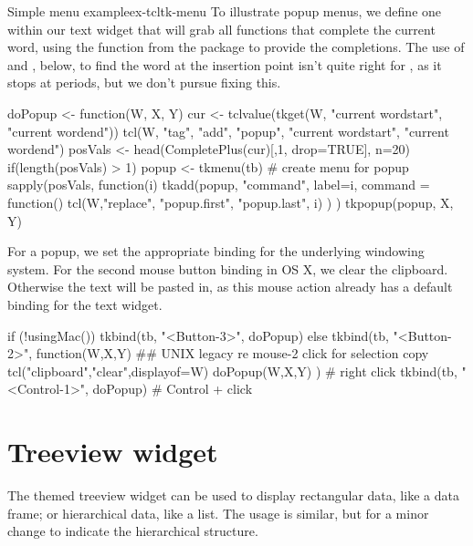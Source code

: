 \begin{example}{Simple menu example}{ex-tcltk-menu}
To illustrate popup menus, we define one within our text widget that
will grab all functions that complete the current word, using the
 function from the  package to
provide the completions.  The use of  and
, below, to find the word at the insertion point
isn't quite right for \R, as it stops at periods, but we don't pursue
fixing this.
\begin{Schunk}
\begin{Sinput}
 doPopup <- function(W, X, Y) {
   cur <- tclvalue(tkget(W, "current  wordstart", 
                            "current wordend"))
   tcl(W, "tag", "add", "popup", "current  wordstart", 
                                 "current wordend")
   posVals <- head(CompletePlus(cur)[,1, drop=TRUE], n=20)
   if(length(posVals) > 1) {
     popup <- tkmenu(tb)                # create menu for popup
     sapply(posVals, function(i) {         
       tkadd(popup, "command", label=i, command = function() {
         tcl(W,"replace", "popup.first", "popup.last", i)
       })
     })
     tkpopup(popup, X, Y)
  }}
\end{Sinput}
\end{Schunk}

For a popup, we set the appropriate binding for the underlying
windowing system. For the second mouse button binding in OS X, we
clear the clipboard. Otherwise the text  will be pasted in, as this mouse
action already has a default binding for the text widget.

\begin{Schunk}
\begin{Sinput}
 if (!usingMac()) {
   tkbind(tb, "<Button-3>", doPopup)
 } else {
   tkbind(tb, "<Button-2>", function(W,X,Y) {
     ## UNIX legacy re mouse-2 click for selection copy
     tcl("clipboard","clear",displayof=W) 
     doPopup(W,X,Y)
     })      # right click
   tkbind(tb, "<Control-1>", doPopup)     # Control + click
 }
\end{Sinput}
\end{Schunk}
\end{example}



\section{Treeview widget}
\label{sec:tcltk:treeview-widget}

The themed treeview widget can be used to display rectangular data,
like a data frame; or hierarchical data, like a list. The usage is
similar, but for a minor change to indicate the hierarchical structure.

